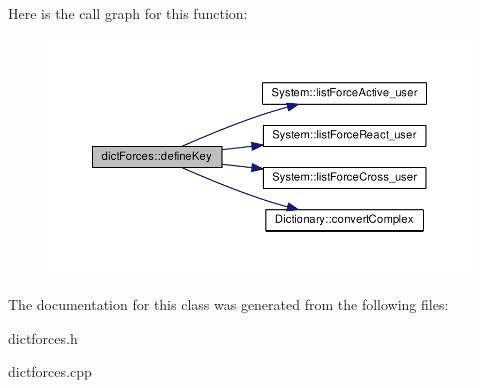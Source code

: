 Here is the call graph for this function\-:
\nopagebreak
\begin{figure}[H]
\begin{center}
\leavevmode
\includegraphics[width=350pt]{classdict_forces_aa063da3300249600b1fcb60622d06759_cgraph}
\end{center}
\end{figure}




The documentation for this class was generated from the following files\-:\begin{DoxyCompactItemize}
\item 
dictforces.\-h\item 
dictforces.\-cpp\end{DoxyCompactItemize}
